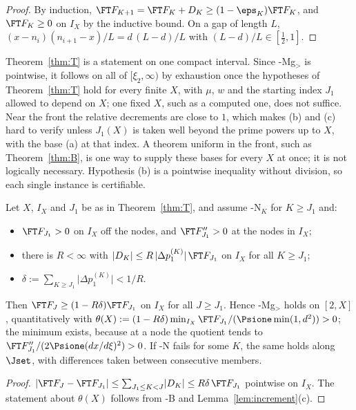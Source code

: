 \begin{proof}
By induction, $\FT F_{K+1}=\FT F_K+D_K\ge(1-\eps_K)\FT F_K$, and $\FT F_K\ge0$ on $I_X$ by the inductive bound. On a gap of
length $L$, $(x-n_i)(n_{i+1}-x)/L=d\,(L-d)/L$ with $(L-d)/L\in[\frac12,1]$.
\end{proof}

Theorem~\ref{thm:T} is a statement on one compact interval. Since \hyp{Mg$_>$} is pointwise, it follows on all of
$[\xi_2,\infty)$ by exhaustion once the hypotheses of Theorem~\ref{thm:T} hold for every finite $X$, with $\mu$, $w$ and the
starting index $J_1$ allowed to depend on $X$; one fixed $X$, such as a computed one, does not suffice. Near the front the
relative decrements are close to $1$, which makes (b) and (c) hard to verify unless $J_1(X)$ is taken well beyond the prime
powers up to $X$, with the base (a) at that index. A theorem uniform in the front, such as Theorem~\ref{thm:B}, is one way to
supply these bases for every $X$ at once; it is not logically necessary. Hypothesis (b) is a pointwise inequality without
division, so each single instance is certifiable.

\begin{theorem}\label{thm:FFred}
Let $X$, $I_X$ and $J_1$ be as in Theorem~\ref{thm:T}, and assume \hyp{N}$_K$ for $K\ge J_1$ and:
\begin{itemize}[leftmargin=3em]
\item[\hyp{B}] $\FT F_{J_1}>0$ on $I_X$ off the nodes, and $\FT F_{J_1}''>0$ at the nodes in $I_X$;
\item[\hyp{$\Phi$}] there is $R<\infty$ with $\lvert D_K\rvert\le R\,\lvert\Delta p_1^{(K)}\rvert\,\FT F_{J_1}$ on $I_X$ for all $K\ge J_1$;
\item[\hyp{p}] $\delta:=\sum_{K\ge J_1}\lvert\Delta p_1^{(K)}\rvert<1/R$.
\end{itemize}
Then $\FT F_J\ge(1-R\delta)\FT F_{J_1}$ on $I_X$ for all $J\ge J_1$. Hence \hyp{Mg$_>$} holds on $[2,X]$, quantitatively with
$\theta(X):=(1-R\delta)\min_{I_X}\FT F_{J_1}/(\Psione\min(1,d^2))>0$; the minimum exists, because at a node the quotient
tends to $\FT F_{J_1}''/(2\Psione(dx/d\xi)^2)>0$. If \hyp{N} fails for some $K$, the same holds along $\Jset$, with
differences taken between consecutive members.
\end{theorem}

\begin{proof}
$\lvert\FT F_J-\FT F_{J_1}\rvert\le\sum_{J_1\le K<J}\lvert D_K\rvert\le R\delta\,\FT F_{J_1}$ pointwise on $I_X$. The statement about
$\theta(X)$ follows from \hyp{B} and Lemma~\ref{lem:increment}(c).
\end{proof}

